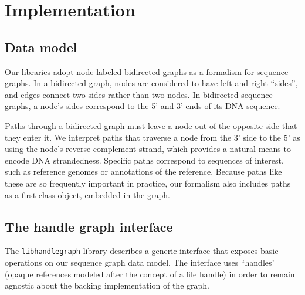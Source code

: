 \documentclass{article}
\begin{document}



\section{Implementation}

\subsection{Data model}

Our libraries adopt node-labeled bidirected graphs as a formalism for sequence graphs.
In a bidirected graph, nodes are considered to have left and right ``sides'', and edges connect two sides rather than two nodes.
In bidirected sequence graphs, a node's sides correspond to the 5' and 3' ends of its DNA sequence. 

Paths through a bidirected graph must leave a node out of the opposite side that they enter it.
We interpret paths that traverse a node from the 3' side to the 5' as using the node's reverse complement strand, which provides a natural means to encode DNA strandedness.
Specific paths correspond to sequences of interest, such as reference genomes or annotations of the reference.
Because paths like these are so frequently important in practice, our formalism also includes paths as a first class object, embedded in the graph.

\subsection{The handle graph interface}

The \texttt{libhandlegraph} library describes a generic interface that exposes basic operations on our sequence graph data model.
The interface uses ``handles' (opaque references modeled after the concept of a file handle) in order to remain agnostic about the backing implementation of the graph.
\end{document}
